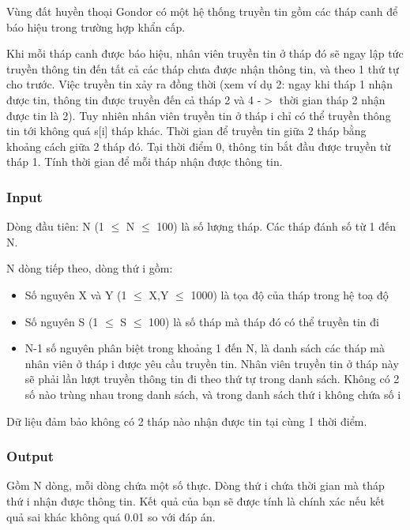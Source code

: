 

Vùng đất huyền thoại Gondor có một hệ thống truyền tin gồm các tháp canh để báo hiệu trong trường hợp khẩn cấp.

Khi mỗi tháp canh được báo hiệu, nhân viên truyền tin ở tháp đó sẽ ngay lập tức truyền thông tin đến tất cả các tháp chưa được nhận thông tin, và theo 1 thứ tự cho trước. Việc truyền tin xảy ra đồng thời (xem ví dụ 2: ngay khi tháp 1 nhận được tin, thông tin được truyền đến cả tháp 2 và 4 -$>$ thời gian tháp 2 nhận được tin là 2). Tuy nhiên nhân viên truyền tin ở tháp i chỉ có thể truyền thông tin tới không quá s[i] tháp khác. Thời gian để truyền tin giữa 2 tháp bằng khoảng cách giữa 2 tháp đó. Tại thời điểm 0, thông tin bắt đầu được truyền từ tháp 1. Tính thời gian để mỗi tháp nhận được thông tin.

\subsubsection{Input}

Dòng đầu tiên: N (1  $\le$  N  $\le$  100) là số lượng tháp. Các tháp đánh số từ 1 đến N.

N dòng tiếp theo, dòng thứ i gồm:
\begin{itemize}
	\item Số nguyên X và Y (1 $\le$ X,Y $\le$ 1000) là tọa độ của tháp trong hệ toạ độ
	\item Số nguyên S (1 $\le$ S $\le$ 100) là số tháp mà tháp đó có thể truyền tin đi
	\item N-1 số nguyên phân biệt trong khoảng 1 đến N, là danh sách các tháp mà nhân viên ở tháp i được yêu cầu truyền tin. Nhân viên truyền tin ở tháp này sẽ phải lần lượt truyền thông tin đi theo thứ tự trong danh sách. Không có 2 số nào trùng nhau trong danh sách, và trong danh sách thứ i không chứa số i
\end{itemize}

Dữ liệu đảm bảo không có 2 tháp nào nhận được tin tại cùng 1 thời điểm.

\subsubsection{Output}

Gồm N dòng, mỗi dòng chứa một số thực. Dòng thứ i chứa thời gian mà tháp thứ i nhận được thông tin. Kết quả của bạn sẽ được tính là chính xác nếu kết quả sai khác không quá 0.01 so với đáp án.

